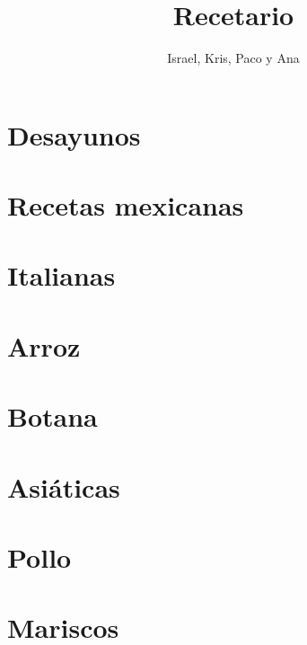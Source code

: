 \documentclass[twoside,12pt]{article}
\date{}
\author{Israel, Kris, Paco y Ana}
\title{Recetario}
\begin{document}
\maketitle

\tableofcontents

\newpage
\section{Desayunos}


\section{Recetas mexicanas}








\section{Italianas}





\section{Arroz}





\section{Botana}


\section{Asi\'aticas}


\section{Pollo}


\section{Mariscos}

\end{document}
